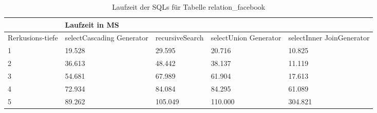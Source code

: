 \begin{table}[H]
	\begin{tabular}{l|l|l|l|l|l|}
		\cline{2-6}
		& \multicolumn{5}{|l|}{Laufzeit in MS}                                                                                                                                                  \\ \hline
		\multicolumn{1}{|l|}{\multirow{2}{2cm}{Rerkusions-tiefe}} & \multicolumn{2}{|l|}{\multirow{2}{3cm}{selectCascading Generator}} & \multirow{2}{2.8cm}{recursiveSearch} & \multirow{2}{2.5cm}{selectUnion Generator} & \multirow{2}{2.5cm}{selectInner JoinGenerator} \\
		\multicolumn{1}{|l|}{}
		& \multicolumn{2}{|l|}{}                                           &                                  &                                     &                                           \\ \hline
		\multicolumn{1}{|l|}{1}                                 & \multicolumn{2}{l|}{19.528}                                      & 29.595                                                & 20.716                                                    & 10.825                                                          \\ \hline
		\multicolumn{1}{|l|}{2}                                 & \multicolumn{2}{l|}{36.613}                                      & 48.442                                                & 38.137                                                    & 11.119                                                          \\ \hline
		\multicolumn{1}{|l|}{3}                                 & \multicolumn{2}{l|}{54.681}                                      & 67.989                                                & 61.904                                                    & 17.613                                                          \\ \hline
		\multicolumn{1}{|l|}{4}                                 & \multicolumn{2}{l|}{72.934}                                      & 84.084                                                & 84.295                                                    & 61.089                                                          \\ \hline
		\multicolumn{1}{|l|}{5}                                 & \multicolumn{2}{l|}{89.262}                                      & 105.049                                               & 110.000                                                   & 304.821                                                         \\ \hline
		
		
	\end{tabular}
	\caption{Laufzeit der SQLs für Tabelle relation\_facebook}
	\label{2.relationfacebook.table}
\end{table}

